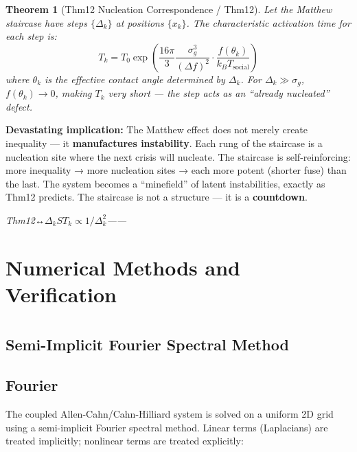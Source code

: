 \documentclass[12pt,a4paper]{article}
\theoremstyle{plain}
\newtheorem{theorem}{ Theorem}[section]
\theoremstyle{definition}
\newcommand{\cn}[1]{\textcolor{scxgray}{\textit{#1}}}
\begin{document}
\begin{theorem}[Thm12 Nucleation Correspondence / Thm12]
\label{thm:thm12_nucleation}
Let the Matthew staircase have steps $\{\Delta_k\}$ at positions $\{x_k\}$.
The characteristic activation time for each step is:
\begin{equation}
    T_k = T_0 \exp\left(\frac{16\pi}{3}\frac{\sigma_g^3}{(\Delta f)^2}
    \cdot \frac{f(\theta_k)}{k_B T_{\text{social}}}\right)
    \label{eq:thm12_time}
\end{equation}
where $\theta_k$ is the effective contact angle determined by $\Delta_k$.
For $\Delta_k \gg \sigma_g$, $f(\theta_k)\to0$, making $T_k$ very short —
the step acts as an ``already nucleated'' defect.
\end{theorem}

\textbf{Devastating implication:} The Matthew effect does not merely create
inequality — it \textbf{manufactures instability}. Each rung of the staircase
is a nucleation site where the next crisis will nucleate. The staircase is
self-reinforcing: more inequality → more nucleation sites → each more potent
(shorter fuse) than the last. The system becomes a ``minefield'' of latent
instabilities, exactly as Thm12 predicts. The staircase is not a structure —
it is a \textbf{countdown}.

\bigskip
\noindent
\cn{Thm12↔$\Delta_k$$S$$T_k\propto1/\Delta_k^2$——}

\section{Numerical Methods and Verification}
\section*{}

\subsection{Semi-Implicit Fourier Spectral Method}
\subsection*{Fourier}

The coupled Allen-Cahn/Cahn-Hilliard system is solved on a uniform 2D grid
using a semi-implicit Fourier spectral method. Linear terms (Laplacians)
are treated implicitly; nonlinear terms are treated explicitly:
\end{document}
